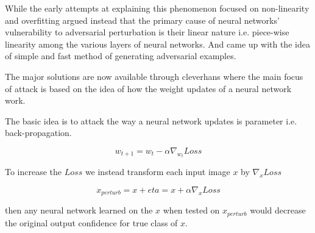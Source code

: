 \documentclass[letterpaper]{article} %
\begin{document}
While the early attempts at explaining this phenomenon focused on non-linearity and overfitting \cite{goodfellow2014explaining} argued instead that the primary cause of neural networks' vulnerability to adversarial perturbation is their linear nature i.e. piece-wise linearity among the various layers of neural networks. And came up with the idea of simple and fast method of generating adversarial examples.

The major solutions are now available through cleverhans \cite{papernot2016cleverhans} where the main focus of attack is based on the idea of how the weight updates of a neural network work.

The basic idea is to attack the way a neural network updates is parameter i.e. back-propagation.

\begin{equation}
w_{t+1} = w_{t} -\alpha {\nabla_{w_{t}}  Loss}
\end{equation}

To increase the $Loss$ we instead transform each input image $x$ by $\nabla_{x}  Loss$

\begin{equation}
x_{perturb} = x + eta =  x + \alpha \nabla_{x}  Loss
\end{equation}

then any neural network learned on the $x$ when tested on $x_{perturb}$ would decrease the original output confidence for true class of $x$.
\end{document}
